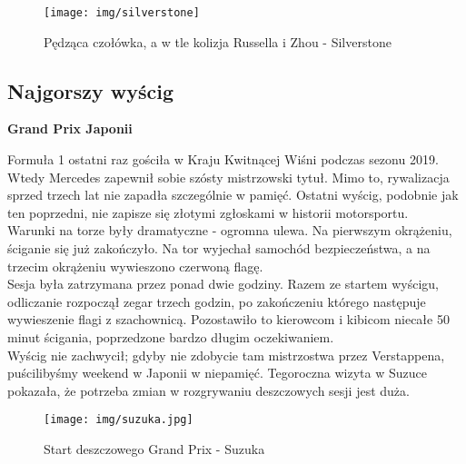 \documentclass[12pt]{article}
\begin{document}
        \begin{figure}[ht]
            \centering
            \texttt{[image: img/silverstone]}
            \caption{Pędząca czołówka, a w tle kolizja Russella i Zhou - Silverstone}
            \label{fig:silverstone}
        \end{figure}

    \newpage
    \subsection{Najgorszy wyścig}
        \begin{center}
            \Huge \textbf{Grand Prix Japonii}
        \end{center}

        Formuła 1 ostatni raz gościła w Kraju Kwitnącej Wiśni podczas sezonu 2019. Wtedy Mercedes zapewnił sobie szósty mistrzowski tytuł. Mimo to, rywalizacja sprzed trzech lat nie zapadła szczególnie w pamięć. Ostatni wyścig, podobnie jak ten poprzedni, nie zapisze się złotymi zgłoskami w historii motorsportu.\\

        Warunki na torze były dramatyczne - ogromna ulewa. Na pierwszym okrążeniu, ściganie się już zakończyło. Na tor wyjechał samochód bezpieczeństwa, a na trzecim okrążeniu wywieszono czerwoną flagę.\\
        
        Sesja była zatrzymana przez ponad dwie godziny. Razem ze startem wyścigu, odliczanie rozpoczął zegar trzech godzin, po zakończeniu którego następuje wywieszenie flagi z szachownicą. Pozostawiło to kierowcom i kibicom niecałe 50 minut ścigania, poprzedzone bardzo długim oczekiwaniem.\\
        
        Wyścig nie zachwycił; gdyby nie zdobycie tam mistrzostwa przez Verstappena, puścilibyśmy weekend w Japonii w niepamięć. Tegoroczna wizyta w Suzuce pokazała, że potrzeba zmian w rozgrywaniu deszczowych sesji jest duża.\\

        \begin{figure}[ht]
            \centering
            \texttt{[image: img/suzuka.jpg]}
            \caption{Start deszczowego Grand Prix - Suzuka}
            \label{fig:japan}
        \end{figure}
        
\end{document}
